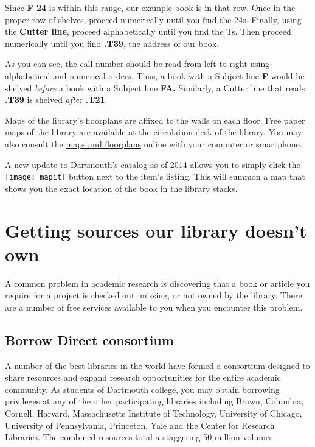 Since \textbf{F 24} is within this range, our example book is in that row. Once
in the proper row of shelves, proceed numerically until you find the 24s.
Finally, using the \textbf{Cutter line}, proceed alphabetically until you find
the Ts. Then proceed numerically until you find \textbf{.T39}, the address of our book.

As you can see, the call number should be read from left to right using
alphabetical and numerical orders. Thus, a book with a Subject line \textbf{F
}would be shelved \emph{before} a book with a Subject line \textbf{FA.}
Similarly, a Cutter line that reads \textbf{.T39} is shelved \emph{after}
\textbf{.T21}.

Maps of the library's floorplans are affixed to the walls on each floor. Free
paper maps of the library are available at the circulation desk of the library.
You may also consult the
\href{http://www.dartmouth.edu/~library/bakerberry/circ/stacksguides/}{maps and
floorplans} online with your computer or smartphone.

\begin{center}
\begin{tcolorbox}[colframe=oyster, coltitle=black, sharp corners, title=\ding{52} Note]
A new update to Dartmouth's catalog as of 2014
allows you to simply click the \texttt{[image: mapit]} button next
to the item's listing. This will summon a map that shows you the exact location
of the book in the library stacks.
\end{tcolorbox}
\end{center}

\section{Getting sources our library doesn't own}

A common problem in academic research is discovering that a book or article you
require for a project is checked out, missing, or not owned by the library.
There are a number of free services available to you when you encounter this
problem.

\subsection{Borrow Direct consortium}

A number of the best libraries in the world have formed a consortium
designed to share resources and expand research opportunities for the  entire academic
community. As students of Dartmouth college, you may obtain  borrowing
privileges at any of the other participating libraries including Brown,
Columbia, Cornell, Harvard, Massachusetts Institute of Technology, University of
Chicago, University of Pennsylvania, Princeton, Yale and the Center for Research
Libraries. The combined resources total a staggering 50 million volumes.

